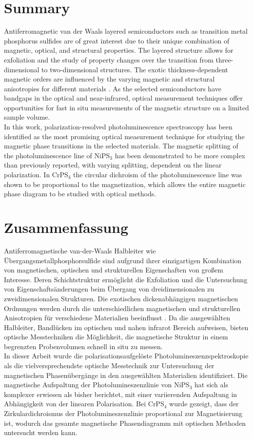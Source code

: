 \documentclass[
	twoside,
	parskip=half,
	a4paper,
]{scrbook}
\begin{document}
\section*{Summary}
Antiferromagnetic van der Waals layered semiconductors such as transition metal phosphorus sulfides are of great interest due to their unique combination of magnetic, optical, and structural properties. 
The layered structure allows for exfoliation and the study of property changes over the transition from three-dimensional to two-dimensional structures.
The exotic thickness-dependent magnetic orders \cite{AFM_review} are influenced by the varying magnetic and structural anisotropies for different materials \cite{MPS_magnetism, CrPS4_magnetic}.
As the selected semiconductors have bandgaps in the optical and near-infrared, optical measurement techniques offer opportunities for fast in situ measurements of the magnetic structure on a limited sample volume.\\
In this work, polarization-resolved photoluminescence spectroscopy has been identified as the most promising optical measurement technique for studying the magnetic phase transitions in the selected materials.
The magnetic splitting of the photoluminescence line of NiPS$_3$ has been demonstrated to be more complex than previously reported, with varying splitting, dependent on the linear polarization.
In CrPS$_4$ the circular dichroism of the photoluminescence line was shown to be proportional to the magnetization, which allows the entire magnetic phase diagram to be studied with optical methods.

\vfill
\section*{Zusammenfassung}
Antiferromagnetische van-der-Waals Halbleiter wie Übergangsmetallphosphorsulfide sind aufgrund ihrer einzigartigen Kombination von magnetischen, optischen und strukturellen Eigenschaften von großem Interesse. 
Deren Schichtstruktur ermöglicht die Exfoliation und die Untersuchung von Eigenschaftsänderungen beim Übergang von dreidimensionalen zu zweidimensionalen Strukturen.
Die exotischen dickenabhängigen magnetischen Ordnungen \cite{AFM_review} werden durch die unterschiedlichen magnetischen und strukturellen Anisotropien für verschiedene Materialien beeinflusst \cite{MPS_magnetism, CrPS4_magnetic}.
Da die ausgewählten Halbleiter, Bandlücken im optischen und nahen infrarot Bereich aufweisen, bieten optische Messtechniken die Möglichkeit, die magnetische Struktur in einem begrenzten Probenvolumen schnell in situ zu messen.\\
In dieser Arbeit wurde die polarisationsaufgelöste Photolumineszenzspektroskopie als die vielversprechendste optische Messtechnik zur Untersuchung der magnetischen Phasenübergänge in den ausgewählten Materialien identifiziert.
Die magnetische Aufspaltung der Photolumineszenzlinie von NiPS$_3$ hat sich als komplexer erwiesen als bisher berichtet, mit einer variierenden Aufspaltung in Abhängigkeit von der linearen Polarisation.
Bei CrPS$_4$ wurde gezeigt, dass der Zirkulardichroismus der Photolumineszenzlinie proportional zur Magnetisierung ist, wodurch das gesamte magnetische Phasendiagramm mit optischen Methoden untersucht werden kann.
\vfill
\end{document}
